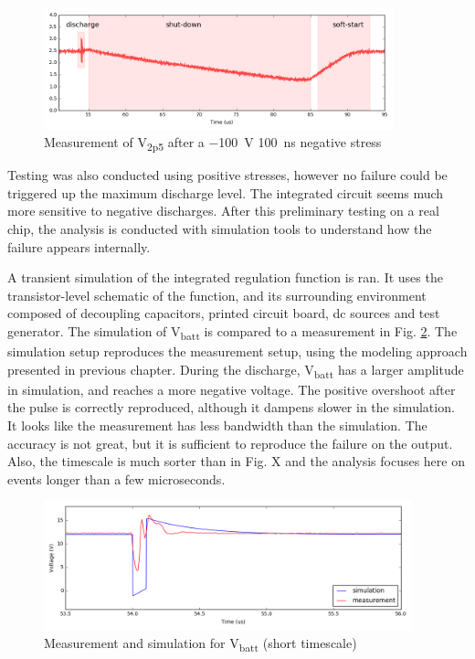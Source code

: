 \begin{figure}[!h]
  \centering
  \includegraphics[width=0.9\textwidth]{src/3/figures/v2p5_measure.png}
  \caption{Measurement of V\textsubscript{2p5} after a \SI{-100}{\volt} \SI{100}{\nano\second} negative stress}
  \label{fig:meas-reset-v2p5}
\end{figure}

Testing was also conducted using positive stresses, however no failure could be triggered up the maximum discharge level.
The integrated circuit seems much more sensitive to negative discharges.
After this preliminary testing on a real chip, the analysis is conducted with simulation tools to understand how the failure appears internally.

A transient simulation of the integrated regulation function is ran.
It uses the transistor-level schematic of the function, and its surrounding environment composed of decoupling capacitors, printed circuit board, \gls{dc} sources and test generator.
The simulation of V\textsubscript{batt} is compared to a measurement in Fig. \ref{fig:wvf-vbatt}.
The simulation setup reproduces the measurement setup, using the modeling approach presented in previous chapter.
During the discharge, V\textsubscript{batt} has a larger amplitude in simulation, and reaches a more negative voltage.
The positive overshoot after the pulse is correctly reproduced, although it dampens slower in the simulation.
It looks like the measurement has less bandwidth than the simulation.
The accuracy is not great, but it is sufficient to reproduce the failure on the output.
Also, the timescale is much sorter than in Fig. X and the analysis focuses here on events longer than a few microseconds.

\begin{figure}[!h]
  \centering
  \includegraphics[width=0.95\textwidth]{src/3/figures/vbatt.png}
  \caption{Measurement and simulation for V\textsubscript{batt} (short timescale)}
  \label{fig:wvf-vbatt}
\end{figure}

